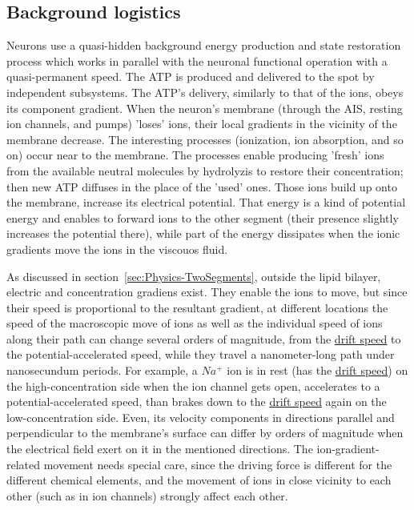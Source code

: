 \subsection{Background logistics\label{sec:Physics-BackgroundLogistics}}
Neurons use a quasi-hidden background energy production 
and state restoration process which works in parallel with 
the neuronal functional operation with a quasi-permanent speed.
The \gls{ATP} is produced and delivered to the spot by 
independent subsystems. The \gls{ATP}'s delivery, similarly to that of the ions,
obeys its component gradient. When the neuron's membrane (through the \gls{AIS}, resting ion channels, and pumps) 'loses' ions,
their local gradients in the vicinity of the membrane decrease.
The interesting processes (ionization, ion absorption, and so on)
occur near to the membrane.
The processes enable producing 'fresh' ions from the available neutral molecules by hydrolyzis to restore their concentration; then
new \gls{ATP} diffuses in the place of the 'used' ones. 
Those ions build up onto the membrane, increase its electrical potential. That energy is a kind of potential energy and enables to forward ions to the other segment (their presence slightly increases
the potential there), while part of the energy dissipates when
the ionic gradients move the ions in the viscouos fluid. 


As discussed in section~\ref{sec:Physics-TwoSegments}, outside
the lipid bilayer, electric and concentration gradiens exist.
They enable the ions to move, but since their speed is proportional
to the resultant gradient, at different locations the speed of 
the macroscopic move of ions as well as the individual speed
of ions along their path can change several orders of magnitude,
from the \href{https://en.wikipedia.org/wiki/Drift_velocity}{drift speed} to the \gls{potential-accelerated speed}, while they travel
a nanometer-long path under nanosecundum periods.
For example, a $Na^+$ ion is in rest (has the \href{https://en.wikipedia.org/wiki/Drift_velocity}{drift speed}) on the high-concentration side
when the ion channel gets open, accelerates to a \gls{potential-accelerated speed}, than brakes down to the \href{https://en.wikipedia.org/wiki/Drift_velocity}{drift speed} again on the low-concentration side. 
Even, its velocity components in directions parallel and perpendicular
to the membrane's surface can differ by orders of magnitude when
the electrical field exert on it in the mentioned directions.
The ion-gradient-related movement needs special care,
since the driving force is different for the different chemical elements, and the movement of ions in close vicinity to each other
(such as in ion channels) strongly affect each other.



